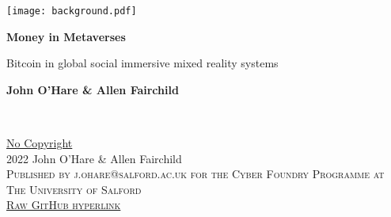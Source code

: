 \documentclass[
	11pt, %
	fleqn, %
	a4paper, %
]{LegrandOrangeBook}
\begin{document}

\titlepage %
	{\texttt{[image: background.pdf]}} %
	{ %
		\centering\sffamily %
		{\Huge\bfseries Money in Metaverses\par} %
		\vspace{16pt} %
		{\LARGE Bitcoin in global social immersive mixed reality systems\par} %
		\vspace{24pt} %
		{\huge\bfseries John O'Hare \& Allen Fairchild\par} %
	}


\thispagestyle{empty} %

~\vfill %

\noindent \href{https://creativecommons.org/publicdomain/zero/1.0/}{No Copyright}\\ 2022 John O'Hare \& Allen Fairchild\\ %

\noindent \textsc{Published by j.ohare@salford.ac.uk for the Cyber Foundry Programme at The University of Salford}\\ %

\noindent \textsc{\href{https://raw.githubusercontent.com/GMCyberFoundry/Metaverse/main/Paper/metaverseBTC.pdf}{Raw GitHub hyperlink}}\\ %
\end{document}
